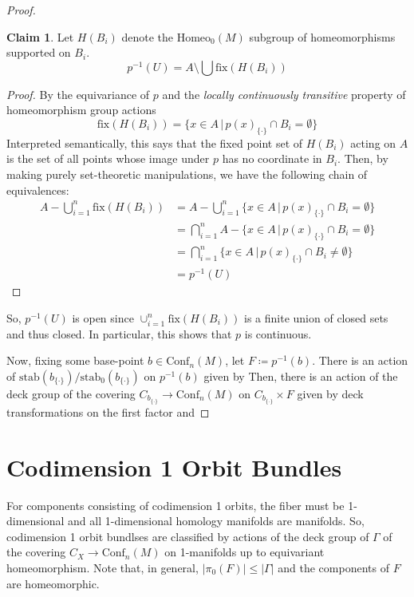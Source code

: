 \documentclass[10pt, oneside]{article}
\newcommand{\homeo}[1][S^1]{\text{Homeo}_0(#1)}
\newcommand{\conf}[2][S^1]{\text{Conf}_{#2}(#1)}
\newcommand{\set}{{\{\cdot\}}}
\theoremstyle{definition}
\newtheorem*{clm*}{Claim}
\theoremstyle{definition}
\begin{document}
\begin{proof}
    \begin{clm*}
        Let $H(B_i)$ denote the $\homeo[M]$ subgroup of homeomorphisms supported on $B_i$.
        $$p^{-1}(U) = A \setminus \bigcup \text{fix}(H(B_i))$$
    \end{clm*}
    \begin{proof}
        By the equivariance of $p$ 
        and the \textit{locally continuously transitive} property of homeomorphism group actions
        $$\text{fix}(H(B_i)) = \{x\in A\, |\, p(x)_\set\cap B_i = \emptyset\}$$
        Interpreted semantically,
        this says that 
        the fixed point set of $H(B_i)$ acting on $A$ is 
        the set of all points whose image under $p$ has no coordinate in $B_i$. 
        Then, by making purely set-theoretic manipulations, 
        we have the following chain of equivalences:
        \begin{align*}
            A - \bigcup_{i=1}^n\text{fix}(H(B_i)) &= A - \bigcup_{i=1}^n\{x\in A\, |\, p(x)_\set\cap B_i = \emptyset\}\\
            &= \bigcap_{i=1}^n A - \{x\in A\, |\, p(x)_\set\cap B_i = \emptyset\}\\
            &= \bigcap_{i=1}^n \{x\in A\, |\, p(x)_\set\cap B_i \neq \emptyset\}\\
            &= p^{-1}(U)
        \end{align*}
    \end{proof}
    So,
    $p^{-1}(U)$ is open
    since $\cup_{i=1}^n\text{fix}(H(B_i))$ is a finite union of closed sets
    and thus closed.
    In particular,
    this shows that $p$ is continuous.

    Now,
    fixing some base-point $b\in\conf[M]{n}$,
    let $F\coloneqq p^{-1}(b)$. 
    There is an action of $\text{stab}(b_\set)/\text{stab}_0(b_\set)$
    on $p^{-1}(b)$ given by 
    Then,
    there is an action
    of the deck group
    of the covering $C_{b_\set}\to \conf[M]{n}$
    on $C_{b_\set}\times F$ 
    given by deck transformations on the first factor
    and
    
\end{proof}

\section{Codimension 1 Orbit Bundles}
For components consisting of codimension 1 orbits, 
the fiber must be 1-dimensional 
and all 1-dimensional homology manifolds are manifolds. 
So, 
codimension 1 orbit bundlses are classified 
by actions of the deck group of $\Gamma$ 
of the covering $C_X \to \conf[M]{n}$ on 1-manifolds 
up to equivariant homeomorphism.
Note that, 
in general, $\lvert \pi_0(F) \rvert \leq \lvert \Gamma \rvert$ 
and the components of $F$ are homeomorphic. 
\end{document}
